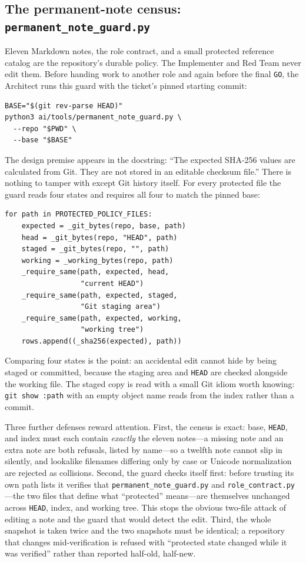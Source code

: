 \documentclass[10pt,aps,prd,twocolumn,nofootinbib]{revtex4-2}
\newcommand{\code}[1]{\texttt{#1}}
\newcommand{\file}[1]{\texttt{#1}}
\begin{document}
\subsection{The permanent-note census: \file{permanent\_note\_guard.py}}
\label{sec:note-guard}

Eleven Markdown notes, the role contract, and a small protected
reference catalog are the repository's durable policy.  The Implementer
and Red Team never edit them.  Before handing work to another role and
again before the final \code{GO}, the Architect runs this guard with
the ticket's pinned starting commit:

\begin{verbatim}
BASE="$(git rev-parse HEAD)"
python3 ai/tools/permanent_note_guard.py \
  --repo "$PWD" \
  --base "$BASE"
\end{verbatim}

The design premise appears in the docstring: ``The expected SHA-256
values are calculated from Git.  They are not stored in an editable
checksum file.''  There is nothing to tamper with except Git history
itself.  For every protected file the guard reads four states and
requires all four to match the pinned base:

\begin{verbatim}
for path in PROTECTED_POLICY_FILES:
    expected = _git_bytes(repo, base, path)
    head = _git_bytes(repo, "HEAD", path)
    staged = _git_bytes(repo, "", path)
    working = _working_bytes(repo, path)
    _require_same(path, expected, head,
                  "current HEAD")
    _require_same(path, expected, staged,
                  "Git staging area")
    _require_same(path, expected, working,
                  "working tree")
    rows.append((_sha256(expected), path))
\end{verbatim}

Comparing four states is the point: an accidental edit cannot hide by
being staged or committed, because the staging area and \code{HEAD} are
checked alongside the working file.  The staged copy is read with a
small Git idiom worth knowing: \code{git show :path} with an empty
object name reads from the index rather than a commit.

Three further defenses reward attention.  First, the census is exact:
base, \code{HEAD}, and index must each contain \emph{exactly} the
eleven notes---a missing note and an extra note are both refusals,
listed by name---so a twelfth note cannot slip in silently, and
lookalike filenames differing only by case or Unicode normalization are
rejected as collisions.  Second, the guard checks itself first: before
trusting its own path lists it verifies that
\file{permanent\_note\_guard.py} and \file{role\_contract.py}---the two
files that define what ``protected'' means---are themselves unchanged
across \code{HEAD}, index, and working tree.  This stops the obvious
two-file attack of editing a note and the guard that would detect the
edit.  Third, the whole snapshot is taken twice and the two snapshots
must be identical; a repository that changes mid-verification is
refused with ``protected state changed while it was verified'' rather
than reported half-old, half-new.
\end{document}

